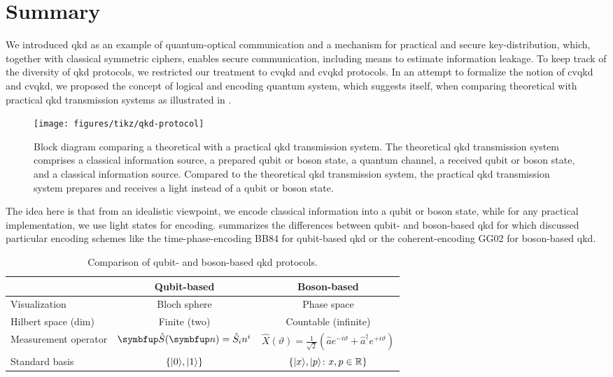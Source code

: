 \section*{Summary}

We introduced \gls{qkd} as an example of quantum-optical communication and a mechanism for practical and secure key-distribution, which, together with classical symmetric ciphers, enables secure communication, including means to estimate information leakage.
To keep track of the diversity of \gls{qkd} protocols, we restricted our treatment to \gls{cvqkd} and \gls{cvqkd} protocols.
In an attempt to formalize the notion of \gls{cvqkd} and \gls{cvqkd}, we proposed the concept of logical and encoding quantum system, which suggests itself, when comparing theoretical with practical \gls{qkd} transmission systems as illustrated in .
\begin{figure}[htb]
	\centering
	\texttt{[image: figures/tikz/qkd-protocol]}
	\caption{Block diagram comparing a theoretical with a practical \gls{qkd} transmission system. The theoretical \gls{qkd} transmission system comprises a classical information source, a prepared qubit or boson state, a quantum channel, a received qubit or boson state, and a classical information source. Compared to the theoretical \gls{qkd} transmission system, the practical \gls{qkd} transmission system prepares and receives a light instead of a qubit or boson state.}\label{fig:qkd_protocol}
\end{figure}
The idea here is that from an idealistic viewpoint, we encode classical information into a qubit or boson state, while for any practical implementation, we use light states for encoding.
 summarizes the differences between qubit- and boson-based \gls{qkd} for which discussed particular encoding schemes like the time-phase-encoding BB84 for qubit-based \gls{qkd} or the coherent-encoding GG02 for boson-based \gls{qkd}.
\begin{table}[htb]
	\centering	
	\begin{tabular}{lcc}
		\toprule
			& Qubit-based & Boson-based \\
		\midrule
			Visualization & Bloch sphere & Phase space \\
			Hilbert space (dim) & Finite (two) & Countable (infinite) \\
			Measurement operator & $\vb{\hat{S}}(\vb{n})=\hat{S}_in^i$ & $\hat{X}(\vartheta)=\frac{1}{\sqrt{2}}\left(\hat{a}e^{-i\vartheta}+\hat{a}^\dagger e^{+i\vartheta}\right)$ \\
			Standard basis & $\left\{\lvert0\rangle,\lvert1\rangle\right\}$ & $\left\{\lvert x\rangle,\lvert p\rangle\colon x,p\in\mathbb{R}\right\}$ \\
		\bottomrule
	\end{tabular}
	\caption{Comparison of qubit- and boson-based \gls{qkd} protocols.}\label{tab:qkd_comparison}
\end{table}
